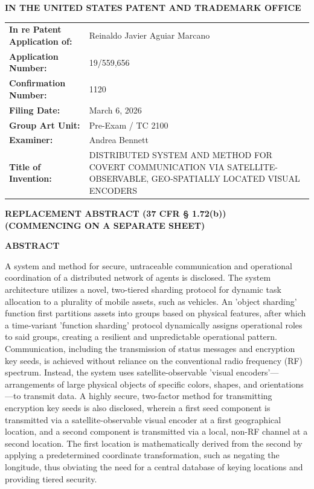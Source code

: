 \documentclass[11pt,letterpaper]{article}
\begin{document}
\thispagestyle{empty}

\begin{center}
    \large\textbf{IN THE UNITED STATES PATENT AND TRADEMARK OFFICE} \\
\end{center}

\vspace{0.3cm}
\noindent\begin{tabular}{p{2.3in}p{4.0in}}
\textbf{In re Patent Application of:} & Reinaldo Javier Aguiar Marcano \\
\textbf{Application Number:} & 19/559,656 \\
\textbf{Confirmation Number:} & 1120 \\
\textbf{Filing Date:} & March 6, 2026 \\
\textbf{Group Art Unit:} & Pre-Exam / TC 2100 \\
\textbf{Examiner:} & Andrea Bennett \\
\textbf{Title of Invention:} & DISTRIBUTED SYSTEM AND METHOD FOR COVERT COMMUNICATION VIA SATELLITE-OBSERVABLE, GEO-SPATIALLY LOCATED VISUAL ENCODERS \\
\end{tabular}

\vspace{0.8cm}
\begin{center}
    \textbf{\large REPLACEMENT ABSTRACT (37 CFR \S{} 1.72(b))} \\
    \textbf{(COMMENCING ON A SEPARATE SHEET)}
\end{center}

\vspace{0.5cm}

\begin{center}
    \textbf{ABSTRACT}
\end{center}

A system and method for secure, untraceable communication and operational coordination of a distributed network of agents is disclosed. The system architecture utilizes a novel, two-tiered sharding protocol for dynamic task allocation to a plurality of mobile assets, such as vehicles. An 'object sharding' function first partitions assets into groups based on physical features, after which a time-variant 'function sharding' protocol dynamically assigns operational roles to said groups, creating a resilient and unpredictable operational pattern. Communication, including the transmission of status messages and encryption key seeds, is achieved without reliance on the conventional radio frequency (RF) spectrum. Instead, the system uses satellite-observable 'visual encoders'---arrangements of large physical objects of specific colors, shapes, and orientations---to transmit data. A highly secure, two-factor method for transmitting encryption key seeds is also disclosed, wherein a first seed component is transmitted via a satellite-observable visual encoder at a first geographical location, and a second component is transmitted via a local, non-RF channel at a second location. The first location is mathematically derived from the second by applying a predetermined coordinate transformation, such as negating the longitude, thus obviating the need for a central database of keying locations and providing tiered security.
\end{document}
